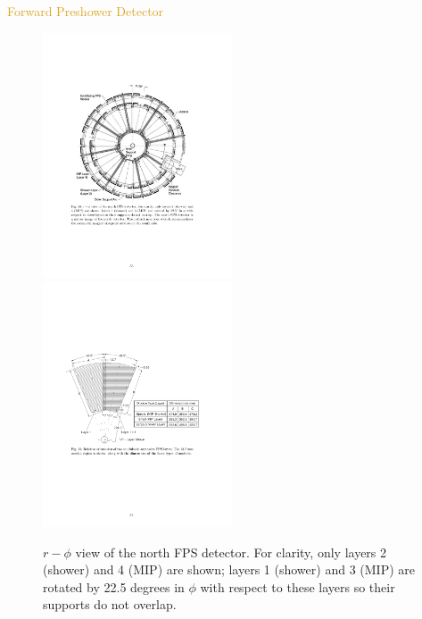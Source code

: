 \begin{frame}{\textcolor{Goldenrod}{Forward Preshower Detector}}
  \begin{overlayarea}{\textwidth}{\textheight}
    \begin{figure}[h]\centering
      \includegraphics[height=0.5\textheight, width=0.5\textwidth]{./Images/29_PS_forward_01.pdf}
      \includegraphics[height=0.5\textheight,width=0.5\textwidth]{./Images/29_PS_forward_modules.pdf}
      \caption*{$r-\phi$ view of the north FPS detector. For clarity,
        only layers 2 (shower) and 4 (MIP) are shown; layers 1
        (shower) and 3 (MIP) are rotated by 22.5 degrees in $\phi$ with respect to
        these layers so their supports do not overlap.}
    \end{figure} 
\end{overlayarea}
\end{frame}


